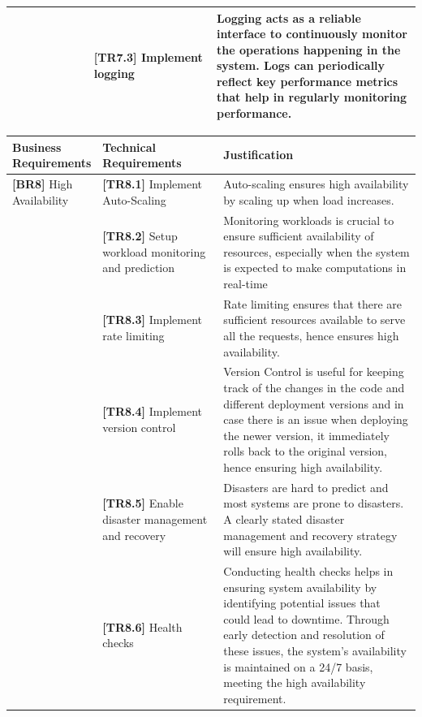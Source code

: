 \documentclass{article}
\begin{document}
\begin{table}[H]
\begin{tabular}{|p{0.2\linewidth}| p{0.3\linewidth} | p{0.5\linewidth} |}
         &  \textbf{[TR7.3]} Implement logging & Logging acts as a reliable interface to continuously monitor the operations happening in the system. Logs can periodically reflect key performance metrics that help in regularly monitoring performance. \cite{Logging}\\ \hline
    \end{tabular}
\end{table}

\begin{table}[H]
    \centering
    \def\arraystretch{1.75}
    \begin{tabular}{|p{0.2\linewidth}| p{0.3\linewidth} | p{0.5\linewidth} |} \hline 
         \textbf{Business Requirements} &  \textbf{Technical Requirements} & \textbf{Justification}\\ \hline 
         \textbf{[BR8]} High Availability&  \textbf{[TR8.1] } Implement Auto-Scaling& Auto-scaling  ensures high availability by scaling up when load increases. \cite{Auto-Scaling for High Availability}\\ \hline
         &  \textbf{[TR8.2]} Setup workload monitoring and prediction& Monitoring workloads is crucial to ensure sufficient availability of resources, especially when the system is expected to make computations in real-time\\ \hline
         &  \textbf{[TR8.3]} Implement rate limiting & Rate limiting ensures that there are sufficient resources available to serve all the requests, hence ensures high availability. \cite{rate}\\ \hline
         &  \textbf{[TR8.4]} Implement version control& Version Control is useful for keeping track of the changes in the code and different deployment versions and in case there is an issue when deploying the newer version, it immediately rolls back to the original version, hence ensuring high availability. \cite{version control}\\ \hline
         &  \textbf{[TR8.5]} Enable disaster management and recovery& Disasters are hard to predict and most systems are prone to disasters. A clearly stated disaster management and recovery strategy will ensure high availability.\\ \hline
         &  \textbf{[TR8.6]} Health checks& Conducting health checks helps in ensuring system availability by identifying potential issues that could lead to downtime. Through early detection and resolution of these issues, the system’s availability is maintained on a 24/7 basis, meeting the high availability requirement. \cite{HA} \\  \hline

\end{tabular}
\end{table}
\end{document}
